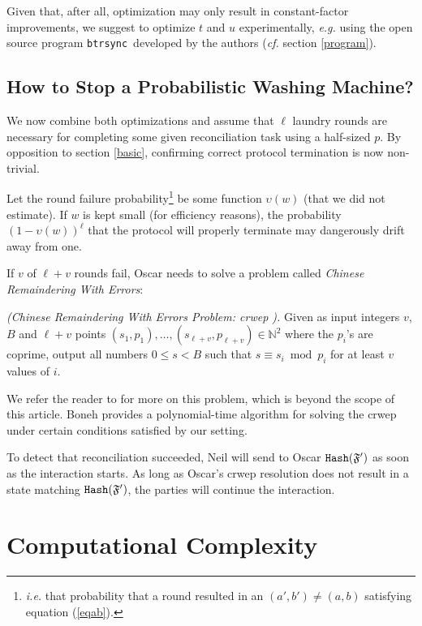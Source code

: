\documentclass[11pt]{llncs}
\newcommand{\btrsync}{\texttt{btrsync}\xspace}
\begin{document}
Given that, after all, optimization may only result in constant-factor improvements, we suggest to optimize $t$ and $u$ experimentally, {\sl e.g.} using the open source program \btrsync\ developed by the authors ({\sl cf.} section  \ref{program}).

\subsection{How to Stop a Probabilistic Washing Machine?} We now combine both optimizations and assume that $\ell$ laundry rounds are necessary for completing some given reconciliation task using a half-sized $p$. By opposition to section \ref{basic}, confirming correct protocol termination is now non-trivial.\smallskip

Let the round failure probability\footnote{{\sl i.e.} that probability that a round resulted in an $(a',b')\neq (a,b)$ satisfying equation (\ref{eqab}).} be some function $\upsilon(w)$ (that we did not estimate). If $w$ is kept small (for efficiency reasons), the probability $\left(1-\upsilon(w)\right)^{\ell}$ that the protocol will properly terminate may dangerously drift away from one.\smallskip

If $v$ of $\ell+v$ rounds fail, Oscar needs to solve a problem called {\sl Chinese Remaindering With Errors}:\smallskip

\begin{problem}{\sl (Chinese Remaindering With Errors Problem: {\sc crwep} \cite{phong}).} Given as input integers $v$, $B$ and $\ell+v$ points $(s_1,p_1),\ldots,(s_{\ell+v},p_{\ell+v})\in \mathbb{N}^2$ where the $p_i$'s are coprime, output all numbers $0 \leq s < B$ such that $s \equiv s_i \bmod p_i$ for at least $v$ values of $i$.
\end{problem}

We refer the reader to \cite{phong} for more on this problem, which is beyond the scope of this article. Boneh \cite{boneh} provides a polynomial-time algorithm for solving the {\sc crwep} under certain conditions satisfied by our setting.\smallskip

To detect that reconciliation succeeded, Neil will send to Oscar $\mbox{{\tt Hash}}(\mathfrak{F}')$ as soon as the interaction starts. As long as Oscar's {\sc crwep} resolution does not result in a state matching $\mbox{{\tt Hash}}(\mathfrak{F}')$, the parties will continue the interaction.

\section{Computational Complexity}
\end{document}
